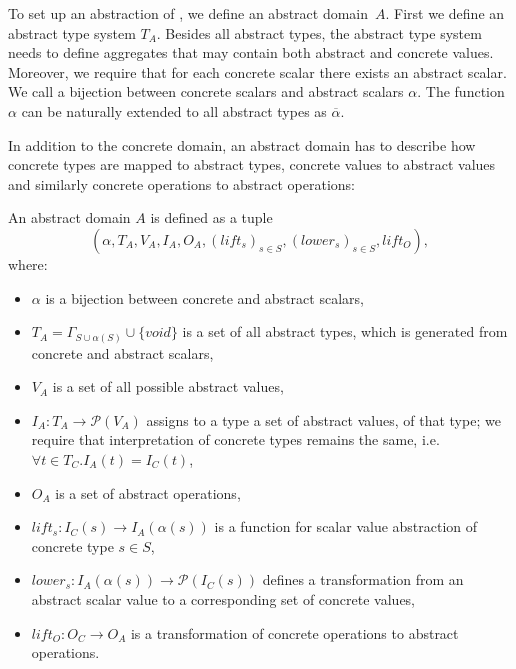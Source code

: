 To set up an abstraction of \LLVM, we define an abstract domain~$A$. First we
define an abstract type system $T_A$. Besides all abstract types, the abstract type
system needs to define aggregates that may contain both abstract and concrete
values. Moreover, we require that for each concrete scalar there exists an abstract scalar.
We call a bijection between concrete scalars and abstract scalars $\alpha$. The
function $\alpha$ can be naturally extended to all abstract types as $\overline{\alpha}$.

In addition to the concrete domain, an abstract domain has to describe how concrete
types are mapped to abstract types, concrete values to abstract values and
similarly concrete operations to abstract operations:
\begin{definition}
    An abstract domain $A$ is defined as a tuple
    \[(\alpha, T_A, V_A, I_A, O_A, (lift_s)_{s \in S}, (lower_s)_{s \in
    S}, lift_O),\] where:
\begin{itemize}
    \item $\alpha$ is a bijection between concrete and abstract scalars,
    \item $T_A = \Gamma_{S \cup \alpha( S )} \cup \{void\}$ is a set of all abstract types,
        which is generated from concrete and abstract scalars,
    \item $V_A$ is a set of all possible abstract values,
    \item $I_A \colon T_A \to \mathcal{P}(V_A)$ assigns to a type a set of
        abstract values, of that type; we require that interpretation of
        concrete types remains the same, i.e.~$\forall t \in T_C . I_A( t ) =
        I_C( t )$,
    \item $O_A$ is a set of abstract operations,
    \item $lift_s \colon I_C( s ) \to I_A( \alpha( s ) )$ is a function
        for scalar value abstraction of concrete type $s \in S$,
    \item $lower_s \colon I_A( \alpha( s ) ) \to \mathcal{P}( I_C( s ) )$ defines a
        transformation from an abstract scalar value to a corresponding set of concrete values,
    \item $lift_O \colon O_C \to O_A$ is a transformation of
        concrete operations to abstract operations.
\end{itemize}
\end{definition}

